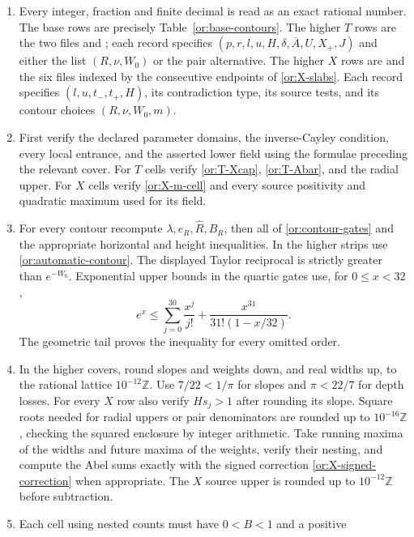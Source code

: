 \begin{enumerate}
\item Every integer, fraction and finite decimal is read as an exact
  rational number.  The base rows are precisely
  Table~\ref{or:base-contours}.  The higher $T$ rows are the two files
   and
  ; each record specifies
  $(p,r,l,u,H,\delta,\overline A,U,X_+,J)$ and either the list
  $(R,\nu,W_0)$ or the pair alternative.  The higher $X$ rows are
   and the six
   files indexed by the consecutive endpoints
  of \eqref{or:X-slabs}.  Each record specifies $(l,u,t_-,t_+,H)$,
  its contradiction type, its source tests, and its contour choices
  $(R,\nu,W_0,m)$.
\item First verify the declared parameter domains, the inverse-Cayley
  condition, every local entrance, and the asserted lower
  field using the formulae preceding the relevant cover.  For $T$
  cells verify \eqref{or:T-Xcap}, \eqref{or:T-Abar}, and the
  radial upper.  For $X$ cells verify \eqref{or:X-m-cell} and every
  source positivity and quadratic maximum used for its field.
\item For every contour recompute $\lambda,e_R,\widehat R,B_R$,
  then all of \eqref{or:contour-gates} and the appropriate horizontal
  and height inequalities.  In the higher strips use
  \eqref{or:automatic-contour}.  The displayed Taylor reciprocal is
  strictly greater than $e^{-W_0}$.  Exponential upper bounds in the
  quartic gates use, for $0\le x<32$,
  \[
    e^x\le\sum_{j=0}^{30}\frac{x^j}{j!}
           +\frac{x^{31}}{31!(1-x/32)}.
  \]
  The geometric tail proves the inequality for every omitted order.
\item In the higher covers, round slopes and weights down, and real
  widths up, to the rational lattice $10^{-12}\mathbb Z$.
  Use $7/22<1/\pi$ for slopes and $\pi<22/7$ for depth losses.
  For every $X$ row also verify $Hs_j>1$ after rounding its slope.
  Square roots needed for radial uppers or pair denominators are
  rounded up to $10^{-16}\mathbb Z$, checking the squared enclosure
  by integer arithmetic.  Take running maxima of the widths and
  future maxima of the weights, verify their nesting, and compute
  the Abel sums exactly with the signed correction
  \eqref{or:X-signed-correction} when appropriate.  The $X$ source
  upper is rounded up to $10^{-12}\mathbb Z$ before subtraction.
\item Each cell using nested counts must have $0<B<1$ and a positive

\end{enumerate}

